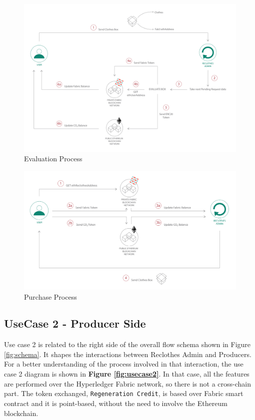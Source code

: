 \begin{figure}[h!]
	\centering
	\includegraphics[totalheight=10cm]{img/evaluation.png}
	\caption{Evaluation Process}
	\label{fig:evaluation}
\end{figure}

\begin{figure}[h!]
	\centering
	\includegraphics[totalheight=8cm]{img/purchase.png}
	\caption{Purchase Process}
	\label{fig:purchase}
\end{figure}

\clearpage
\subsection{UseCase 2 - Producer Side}

Use case 2 is related to the right side of the overall flow schema shown in Figure \ref{fig:schema}.
It shapes the interactions between Reclothes Admin and Producers. For a better understanding of the 
process involved in that interaction, the use case 2 diagram is shown in \textbf{Figure \ref{fig:usecase2}}.
In that case, all the features are performed over the Hyperledger Fabric network, so there is not a cross-chain 
part. The token exchanged, \texttt{Regeneration Credit}, is based over Fabric smart contract and it is point-based, 
without the need to involve the Ethereum blockchain.

